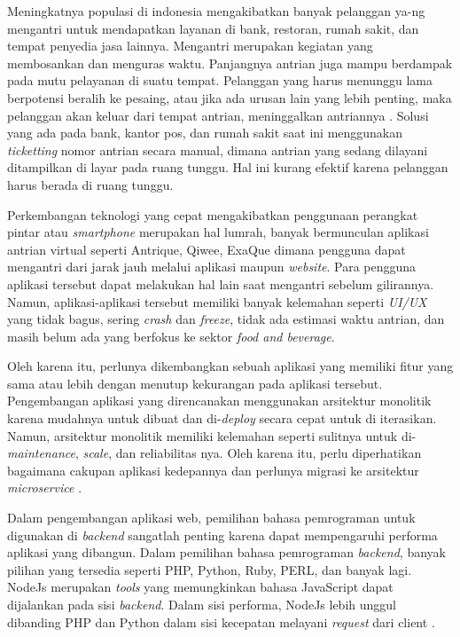 Meningkatnya populasi di indonesia mengakibatkan banyak pelanggan ya-ng mengantri untuk mendapatkan layanan di bank, restoran, rumah sakit, dan tempat penyedia jasa lainnya. Mengantri merupakan kegiatan yang membosankan dan menguras waktu. Panjangnya antrian juga mampu berdampak pada mutu pelayanan di suatu tempat. Pelanggan yang harus menunggu lama berpotensi beralih ke pesaing, atau jika ada urusan lain yang lebih penting, maka pelanggan akan keluar dari tempat antrian, meninggalkan antriannya \cite{khong2017queue}\cite{Ghazal2016}\cite{Uddin2016}. Solusi yang ada pada bank, kantor pos, dan rumah sakit saat ini menggunakan \textit{ticketting} nomor antrian secara manual, dimana antrian yang sedang dilayani ditampilkan di layar pada ruang tunggu. Hal ini kurang efektif karena pelanggan harus berada di ruang tunggu\cite{Ghazal2016}.

Perkembangan teknologi yang cepat mengakibatkan penggunaan perangkat pintar atau \textit{smartphone} merupakan hal lumrah, banyak bermunculan aplikasi antrian virtual seperti Antrique, Qiwee, ExaQue dimana pengguna dapat mengantri dari jarak jauh melalui aplikasi maupun \textit{website}. Para pengguna aplikasi tersebut dapat melakukan hal lain saat mengantri sebelum gilirannya. Namun, aplikasi-aplikasi tersebut memiliki banyak kelemahan seperti \textit{UI/UX} yang tidak bagus, sering \textit{crash} dan \textit{freeze}, tidak ada estimasi waktu antrian, dan masih belum ada yang berfokus ke sektor \textit{food and beverage}.

Oleh karena itu, perlunya dikembangkan sebuah aplikasi yang memiliki fitur yang sama atau lebih dengan menutup kekurangan pada aplikasi tersebut. Pengembangan aplikasi yang direncanakan menggunakan arsitektur monolitik karena mudahnya untuk dibuat dan di-\textit{deploy} secara cepat untuk di iterasikan. Namun, arsitektur monolitik memiliki kelemahan seperti sulitnya untuk di-\textit{maintenance}, \textit{scale}, dan reliabilitas nya. Oleh karena itu, perlu diperhatikan bagaimana cakupan aplikasi kedepannya dan perlunya migrasi ke arsitektur \textit{microservice} \cite{gos2020comparison} \cite{jatkiewicz2023differences}.

Dalam pengembangan aplikasi web, pemilihan bahasa pemrograman untuk digunakan di \textit{backend} sangatlah penting karena dapat mempengaruhi performa aplikasi yang dibangun. Dalam pemilihan bahasa pemrograman \textit{backend}, banyak pilihan yang tersedia seperti PHP, Python, Ruby, PERL, dan banyak lagi. NodeJs merupakan \textit{tools} yang memungkinkan bahasa JavaScript dapat dijalankan pada sisi \textit{backend}. Dalam sisi performa, NodeJs lebih unggul dibanding PHP dan Python dalam sisi kecepatan melayani \textit{request} dari client \cite{William2020} \cite{Odeniran2023}.

